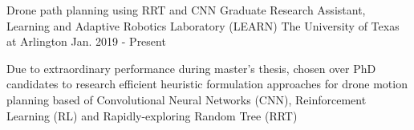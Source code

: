 \begin{cventries}
\vspace*{0.05in}
	\cventry		  
    	{ Drone path planning using RRT and CNN} %
    	{ Graduate Research Assistant, Learning and Adaptive Robotics Laboratory (LEARN)} 
    	{The University of Texas at Arlington}
    	{Jan. 2019 - Present} %
    	{
      		\begin{cvitems} %
        		\item { Due to extraordinary performance during master's thesis, chosen over PhD candidates to research efficient heuristic formulation approaches for drone motion planning based of Convolutional Neural Networks (CNN), Reinforcement Learning (RL) and Rapidly-exploring Random Tree (RRT)} \vspace*{0.05in}
      		\end{cvitems}  
    	}
    	

\end{cventries}
